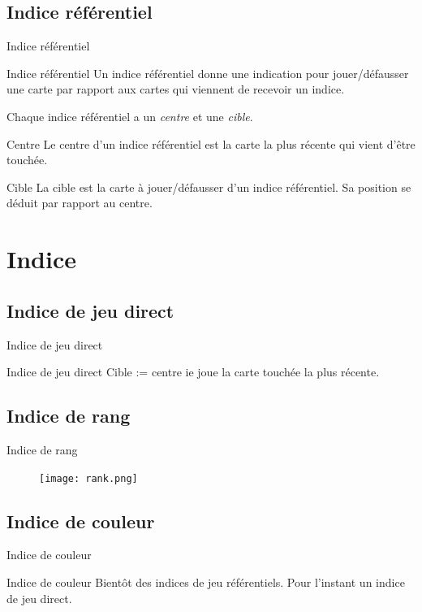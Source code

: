 \documentclass{beamer}
\begin{document}
\subsection{Indice référentiel}
\begin{frame}{Indice référentiel}
    \begin{block}{Indice référentiel}
        Un indice référentiel donne une indication pour jouer/défausser une
        carte par rapport aux cartes qui viennent de recevoir un indice.

        Chaque indice référentiel a un \emph{centre} et une \emph{cible}.
    \end{block}
    \begin{block}{Centre}
        Le centre d'un indice référentiel est la carte la plus récente qui
        vient d'être touchée.
    \end{block}
    \begin{block}{Cible}
        La cible est la carte à jouer/défausser d'un indice référentiel. Sa
        position se déduit par rapport au centre.
    \end{block}
\end{frame}

\section{Indice}

\subsection{Indice de jeu direct}
\begin{frame}{Indice de jeu direct}
    \begin{block}{Indice de jeu direct}
        Cible := centre ie joue la carte touchée la plus récente.
    \end{block}
\end{frame}

\subsection{Indice de rang}
\begin{frame}{Indice de rang}
    \begin{figure}[h]
        \texttt{[image: rank.png]}
    \end{figure}
\end{frame}

\subsection{Indice de couleur}
\begin{frame}{Indice de couleur}
    \begin{block}{Indice de couleur}
        Bientôt des indices de jeu référentiels. Pour l'instant un indice de
        jeu direct.
    \end{block}
\end{frame}
\end{document}
